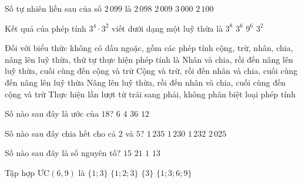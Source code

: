 \begin{ex}%
	Số tự nhiên liền sau của số $2\,099$ là
	\choice
	{$2\,098$}
	{$2\,009$}
	{$3\,000$}
	{\True $2\,100$}
\end{ex}

\begin{ex}%
	Kết quả của phép tính $3^4 \cdot 3^2$ viết dưới dạng một luỹ thừa là
	\choice
	{$3^8$}
	{\True $3^6$}
	{$9^6$}
	{$3^2$}
\end{ex}

\begin{ex}%
	Đối với biểu thức không có dấu ngoặc, gồm các phép tính cộng, trừ, nhân, chia, nâng lên luỹ thừa, thứ tự thực hiện phép tính là
	\choice
	{Nhân và chia, rồi đến nâng lên luỹ thừa, cuối cùng đến cộng và trừ}
	{Cộng và trừ, rồi đến nhân và chia, cuối cùng đến nâng lên luỹ thừa}
	{\True Nâng lên luỹ thừa, rồi đến nhân và chia, cuối cùng đến cộng và trừ}
	{Thực hiện lần lượt từ trái sang phải, không phân biệt loại phép tính}
\end{ex}

\begin{ex}%
	Số nào sau đây là ước của $18$?
	\choice
	{\True $6$}
	{$4$}
	{$36$}
	{$12$}
\end{ex}

\begin{ex}%
	Số nào sau đây chia hết cho cả $2$ và $5$?
	\choice
	{$1\,235$}
	{\True $1\,230$}
	{$1\,232$}
	{$2\,025$}
\end{ex}

\begin{ex}%
	Số nào sau đây là số nguyên tố?
	\choice
	{$15$}
	{$21$}
	{$1$}
	{\True $13$}
\end{ex}

\begin{ex}%
	Tập hợp $\text{ƯC}(6, 9)$ là
	\choice
	{\True $\{1; 3\}$}
	{$\{1; 2; 3\}$}
	{$\{3\}$}
	{$\{1; 3; 6; 9\}$}
\end{ex}

